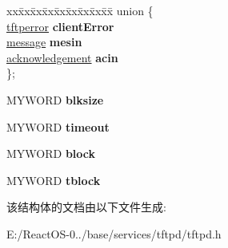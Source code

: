 \begin{DoxyCompactItemize}
\begin{tabbing}
\end{tabbing}\item 
\mbox{\label{structrequest_a8de4a0d38aed8a348ca07c9c22240128}} 
\begin{tabbing}
xx\=xx\=xx\=xx\=xx\=xx\=xx\=xx\=xx\=\kill
union \{\\
\>\hyperlink{structtftperror}{tftperror} {\bfseries clientError}\\
\>\hyperlink{structmessage}{message} {\bfseries mesin}\\
\>\hyperlink{structacknowledgement}{acknowledgement} {\bfseries acin}\\
\}; \\

\end{tabbing}\item 
\mbox{\label{structrequest_a672cfd79643d00f6e01e1a8151a27aab}} 
M\+Y\+W\+O\+RD {\bfseries blksize}
\item 
\mbox{\label{structrequest_ad060faa7f38277e4563819f29d8d2dab}} 
M\+Y\+W\+O\+RD {\bfseries timeout}
\item 
\mbox{\label{structrequest_af6f35669b6862658457ff3313d9bc92c}} 
M\+Y\+W\+O\+RD {\bfseries block}
\item 
\mbox{\label{structrequest_accc33a1f7603711cdcdef493889ae9b1}} 
M\+Y\+W\+O\+RD {\bfseries tblock}
\end{DoxyCompactItemize}


该结构体的文档由以下文件生成\+:\begin{DoxyCompactItemize}
\item 
E\+:/\+React\+O\+S-\/0../base/services/tftpd/tftpd.\+h\end{DoxyCompactItemize}
